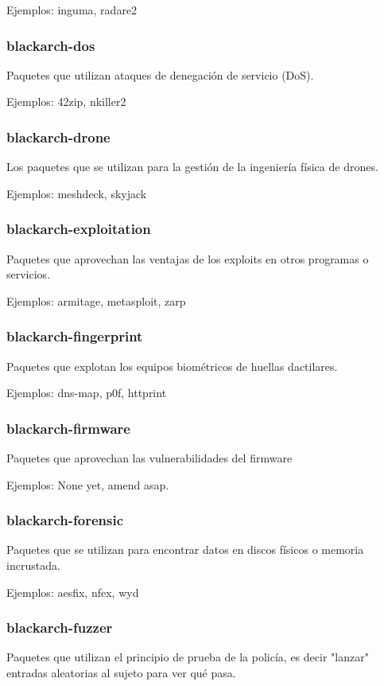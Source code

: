 \documentclass[a4paper, oneside, 11pt]{book}
\begin{document}
Ejemplos: inguma, radare2

\subsubsection{blackarch-dos}
Paquetes que utilizan ataques de denegaci\'on de servicio (DoS).

Ejemplos: 42zip, nkiller2

\subsubsection{blackarch-drone}
Los paquetes que se utilizan para la gesti\'on de la ingenier\'ia f\'isica de drones.

Ejemplos: meshdeck, skyjack

\subsubsection{blackarch-exploitation}
Paquetes que aprovechan las ventajas de los exploits en otros programas o servicios.

Ejemplos: armitage, metasploit, zarp

\subsubsection{blackarch-fingerprint}
Paquetes que explotan los equipos biom\'etricos de huellas dactilares.

Ejemplos: dns-map, p0f, httprint

\subsubsection{blackarch-firmware}
Paquetes que aprovechan las vulnerabilidades del firmware

Ejemplos: None yet, amend asap.

\subsubsection{blackarch-forensic}
Paquetes que se utilizan para encontrar datos en discos f\'isicos o memoria incrustada.

Ejemplos: aesfix, nfex, wyd

\subsubsection{blackarch-fuzzer}
Paquetes que utilizan el principio de prueba de la polic\'ia, es decir
"lanzar" entradas aleatorias al sujeto para ver qu\'e pasa.
\end{document}
